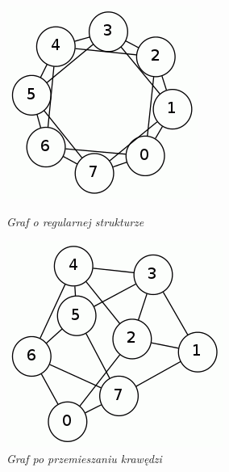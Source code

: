 \documentclass[a4paper, 12pt]{article}
\begin{document}
\begin{figure}[ht]
\begin{minipage}[b]{0.45\linewidth}
\centering
\includegraphics[width=\textwidth]{regularny.png}
\caption{\em Graf o regularnej strukturze}
\label{fig:regul}
\end{minipage}
\hspace{0.5cm}
\begin{minipage}[b]{0.45\linewidth}
\centering
\includegraphics[width=\textwidth]{pomieszany.png}
\caption{\em Graf po przemieszaniu krawędzi}
\label{fig:pomiesz}
\end{minipage}
\end{figure}
\end{document}
